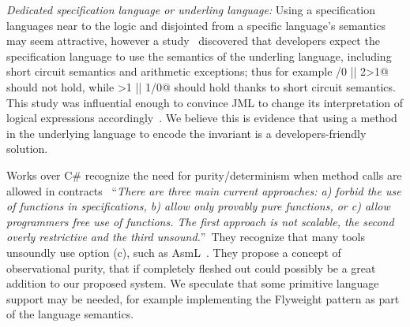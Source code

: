 


\textit{Dedicated specification language or underling language:}
Using a specification languages near to the logic and disjointed from a specific language's
semantics may seem attractive, however
a study~\cite{chalin2007logical} discovered that developers expect
the specification language to use the semantics of the underling language, including
short circuit semantics and arithmetic exceptions; thus for example
/0 || 2>1@
should not hold, while 
>1 || 1/0@ should hold thanks to short circuit semantics.
This study was influential enough to convince JML to change its interpretation of logical expressions
accordingly~\cite{chalin2008jml}.
We believe this is evidence that using a method in the underlying language to encode the invariant is
a developers-friendly solution.



Works over C\# recognize the need
for purity/determinism when method calls are allowed in contracts~\cite{barnett200499}
``\emph{There are three main current approaches: a) forbid the use of functions in specifications, b) allow only provably pure functions, or c) allow programmers free use
	of functions. The first approach is not scalable, the second overly restrictive and
	the third unsound.}''\ 
They recognize that many tools unsoundly use option (c), such as AsmL~\cite{barnett2003runtime}.
They propose a concept of observational purity, that if completely fleshed out
could possibly be a great addition to our proposed system.
We speculate that some 
primitive language support may be needed, for example implementing the Flyweight pattern 
as part of the language semantics.








